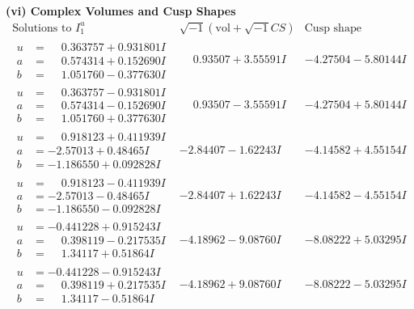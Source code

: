 \documentclass[1p]{elsarticle_modified}
\theoremstyle{definition}
\newcommand{\I}{\sqrt{-1}}
\begin{document}
\newpage\flushleft \textbf{(vi) Complex Volumes and Cusp Shapes}
$$\begin{array}{c|c|c}  
\text{Solutions to }I^u_{1}& \I (\text{vol} + \sqrt{-1}CS) & \text{Cusp shape}\\
 \hline 
\begin{aligned}
u &= \phantom{-}0.363757 + 0.931801 I \\
a &= \phantom{-}0.574314 + 0.152690 I \\
b &= \phantom{-}1.051760 - 0.377630 I\end{aligned}
 & \phantom{-}0.93507 + 3.55591 I & -4.27504 - 5.80144 I \\ \hline\begin{aligned}
u &= \phantom{-}0.363757 - 0.931801 I \\
a &= \phantom{-}0.574314 - 0.152690 I \\
b &= \phantom{-}1.051760 + 0.377630 I\end{aligned}
 & \phantom{-}0.93507 - 3.55591 I & -4.27504 + 5.80144 I \\ \hline\begin{aligned}
u &= \phantom{-}0.918123 + 0.411939 I \\
a &= -2.57013 + 0.48465 I \\
b &= -1.186550 + 0.092828 I\end{aligned}
 & -2.84407 - 1.62243 I & -4.14582 + 4.55154 I \\ \hline\begin{aligned}
u &= \phantom{-}0.918123 - 0.411939 I \\
a &= -2.57013 - 0.48465 I \\
b &= -1.186550 - 0.092828 I\end{aligned}
 & -2.84407 + 1.62243 I & -4.14582 - 4.55154 I \\ \hline\begin{aligned}
u &= -0.441228 + 0.915243 I \\
a &= \phantom{-}0.398119 - 0.217535 I \\
b &= \phantom{-}1.34117 + 0.51864 I\end{aligned}
 & -4.18962 - 9.08760 I & -8.08222 + 5.03295 I \\ \hline\begin{aligned}
u &= -0.441228 - 0.915243 I \\
a &= \phantom{-}0.398119 + 0.217535 I \\
b &= \phantom{-}1.34117 - 0.51864 I\end{aligned}
 & -4.18962 + 9.08760 I & -8.08222 - 5.03295 I \\ \hline\begin{aligned}

\end{aligned}
\end{array}$$
\end{document}
